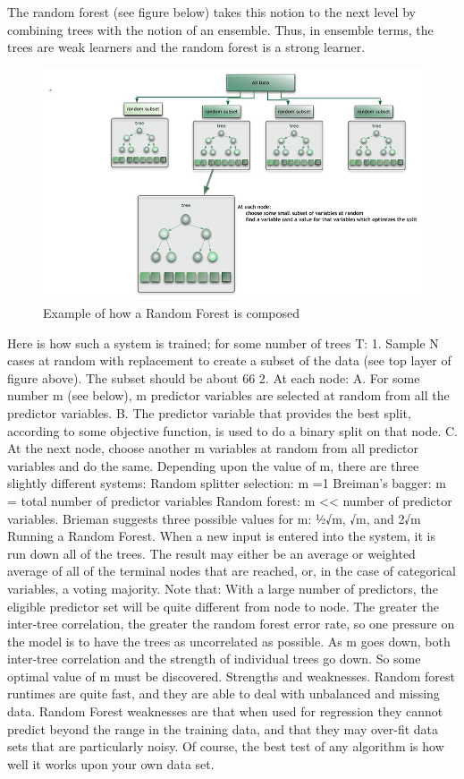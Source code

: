 The random forest (see figure below) takes this notion to the next level by combining trees with the notion of an ensemble. Thus, in ensemble terms, the trees are weak learners and the random forest is a strong learner.

\begin{figure}
\centering
    \includegraphics[width=0.7\columnwidth]{img/random_forest_small.jpg}
    \caption{Example of how a Random Forest is composed}
    \label{Fig.4}
\end{figure}

Here is how such a system is trained; for some number of trees T:
1. Sample N cases at random with replacement to create a subset of the data (see top layer of figure above). The subset should be about 66%
2. At each node:
A. For some number m (see below), m predictor variables are selected at random from all the
predictor variables.
B. The predictor variable that provides the best split, according to some objective function, is
used to do a binary split on that node.
C. At the next node, choose another m variables at random from all predictor variables and do
the same.
Depending upon the value of m, there are three slightly different systems:
Random splitter selection: m =1
Breiman’s bagger: m = total number of predictor variables
Random forest: m << number of predictor variables. Brieman suggests three possible values for m: 1⁄2√m, √m, and 2√m
Running a Random Forest. When a new input is entered into the system, it is run down all of the trees. The result may either be an average or weighted average of all of the terminal nodes that are reached, or, in the case of categorical variables, a voting majority.
Note that:
With a large number of predictors, the eligible predictor set will be quite different from node to node.
The greater the inter-tree correlation, the greater the random forest error rate, so one pressure on the model is to have the trees as uncorrelated as possible.
As m goes down, both inter-tree correlation and the strength of individual trees go down. So some optimal value of m must be discovered.
Strengths and weaknesses. Random forest runtimes are quite fast, and they are able to deal with unbalanced and missing data. Random Forest weaknesses are that when used for regression they cannot predict beyond the range in the training data, and that they may over-fit data sets that are particularly noisy. Of course, the best test of any algorithm is how well it works upon your own data set.
